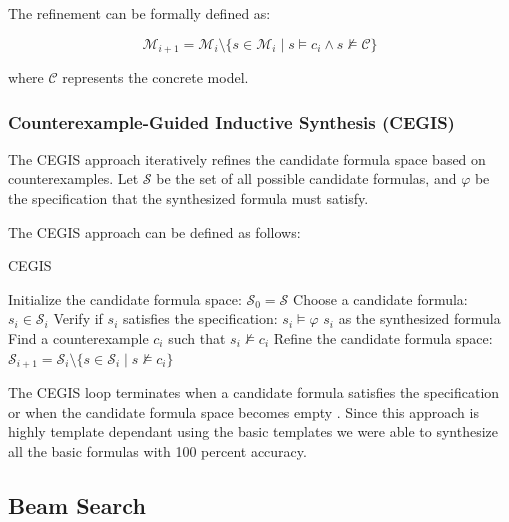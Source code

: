 \documentclass[runningheads]{llncs}
\renewcommand{\phi}{\varphi}
\begin{document}
The refinement can be formally defined as:

\begin{equation}
\mathcal{M}_{i+1} = \mathcal{M}_i \setminus \{s \in \mathcal{M}_i \mid s \models c_i \wedge s \not\models \mathcal{C}\}
\end{equation}

where $\mathcal{C}$ represents the concrete model.

\subsubsection{Counterexample-Guided Inductive Synthesis (CEGIS)}
The CEGIS approach iteratively refines the candidate formula space based on counterexamples. Let $\mathcal{S}$ be the set of all possible candidate formulas, and $\phi$ be the specification that the synthesized formula must satisfy.

The CEGIS approach can be defined as follows:

\begin{algorithm}[H]
\caption{CEGIS}
\begin{algorithmic}[1]
\State Initialize the candidate formula space: $\mathcal{S}_0 = \mathcal{S}$
    \State Choose a candidate formula: $s_i \in \mathcal{S}_i$
    \State Verify if $s_i$ satisfies the specification: $s_i \models \phi$
    \If{$s_i \models \phi$}
        \State \Return $s_i$ as the synthesized formula
    \Else
        \State Find a counterexample $c_i$ such that $s_i \not\models c_i$
    \EndIf
    \State Refine the candidate formula space: $\mathcal{S}_{i+1} = \mathcal{S}_i \setminus \{s \in \mathcal{S}_i \mid s \not\models c_i\}$
\EndFor
\end{algorithmic}
\end{algorithm}

The CEGIS loop terminates when a candidate formula satisfies the specification or when the candidate formula space becomes empty \cite{cegis10.1007/978-3-319-96145-3_15}. Since this approach is highly template dependant using the basic templates we were able to synthesize all the basic formulas with 100 percent accuracy.

\subsection{Beam Search}

\end{document}
